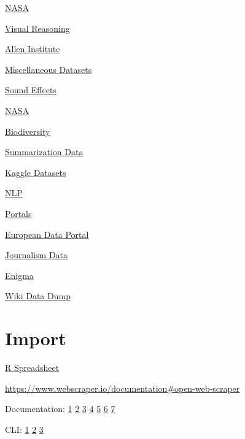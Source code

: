 \documentclass[]{book}
\begin{document}
\href{https://bmtgoncalves.github.io/pyNASA/}{NASA}

\href{http://lic.nlp.cornell.edu/nlvr/}{Visual Reasoning}

\href{http://allenai.org/data.html}{Allen Institute}

\href{http://users.stat.ufl.edu/~winner/datasets.html}{Miscellaneous
Datasets}

\href{http://bbcsfx.acropolis.org.uk/}{Sound Effects}

\href{https://open.nasa.gov/blog/}{NASA}

\href{https://www.gbif.org}{Biodiversity}

\href{https://summari.es}{Summarization Data}

\href{https://www.kaggle.com/datasets}{Kaggle Datasets}

\href{https://github.com/niderhoff/nlp-datasets/blob/master/README.md}{NLP}

\href{https://www.opendatasoft.com/a-comprehensive-list-of-all-open-data-portals-around-the-world/}{Portals}

\href{http://www.europeandataportal.eu/}{European Data Portal}

\href{http://cjlab.stanford.edu/2015/09/30/lab-launch-and-data-sets/}{Journalism
Data}

\href{https://public.enigma.com/}{Enigma}

\href{http://dumps.wikimedia.org/other/pagecounts-raw/}{Wiki Data Dump}

\section{Import}\label{import-2}

\href{https://www.jamovi.org/}{R Spreadsheet}

\url{https://www.webscraper.io/documentation\#open-web-scraper}

Documentation: \href{http://databasenotetaker.com/}{1} \textbar{}
\href{https://dataedo.com/}{2} \textbar{}
\href{https://www.apexsql.com/sql-tools-doc.aspx}{3} \textbar{}
\href{https://techwriter.me/best-practices-guide/documenting-databases.aspx}{4}
\textbar{}
\href{http://help.osf.io/m/bestpractices/l/618767-how-to-make-a-data-dictionary}{5}
\textbar{}
\href{https://dataedo.com/blog/different-types-of-tools-you-can-use-to-document-your-database}{6}
\textbar{} \href{https://drawsql.app/\#features}{7}

CLI:
\href{http://bconnelly.net/working-with-csvs-on-the-command-line/\#taking-a-peek-at-the-data-set}{1}
\textbar{}
\href{https://opensource.com/article/17/2/command-line-tools-data-analysis-linux?sc_cid=701600000011jJVAAY}{2}
\textbar{}
\href{http://alexisperrier.com/shell/2017/11/07/command-line-data-scientist.html}{3}
\end{document}
